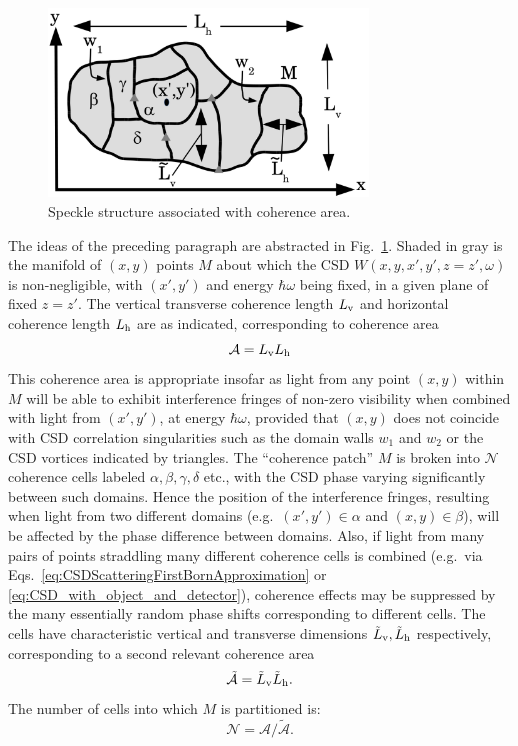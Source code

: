 \documentclass[%
 reprint,
 amsmath,amssymb,
 aps,
]{revtex4-1}
\begin{document}
\begin{figure}
\includegraphics[width=8.5cm]{Figures/CoherenceAreas.png}
\caption{Speckle structure associated with coherence area.}
\label{CoherenceAreas}
\end{figure}

The ideas of the preceding paragraph are abstracted in Fig.~\ref{CoherenceAreas}.  Shaded in gray is the manifold of $(x,y)$ points $M$ about which the CSD $W(x,y,x',y',z=z',\omega)$ is non-negligible, with $(x',y')$ and energy $\hbar\omega$ being fixed, in a given plane of fixed $z=z'$.  The vertical transverse coherence length $L_{\textrm v}$ and horizontal coherence length $L_{\textrm h}$ are as indicated, corresponding to coherence area
%
\begin{equation}
    \mathcal{A}=L_{\textrm v}L_{\textrm h}
\end{equation}
%
This coherence area is appropriate insofar as light from any point $(x,y)$ within $M$ will be able to exhibit interference fringes of non-zero visibility when combined with light from $(x',y')$, at energy $\hbar\omega$, provided that $(x,y)$ does not coincide with CSD correlation singularities such as the domain walls $w_1$ and $w_2$ or the CSD vortices indicated by triangles. The ``coherence patch'' $M$ is broken into $\mathcal{N}$ coherence cells labeled $\alpha,\beta,\gamma,\delta$ etc., with the CSD phase varying significantly between such domains.  Hence the position of the interference fringes, resulting when light from two different domains (e.g.~$(x',y')\in\alpha$ and $(x,y)\in\beta$), will be  affected by the phase difference between domains.  Also, if light from many pairs of points straddling many different coherence cells is combined (e.g.~via Eqs.~\ref{eq:CSDScatteringFirstBornApproximation} or  \ref{eq:CSD_with_object_and_detector}), coherence effects may be suppressed by the many essentially random phase shifts corresponding to different cells.  The cells have characteristic vertical and transverse dimensions $\tilde{L}_{\textrm v},\tilde{L}_{\textrm h}$ respectively, corresponding to a second relevant coherence area
%
\begin{equation}
    \tilde{\mathcal{A}}=\tilde{L}_{\textrm v} \tilde{L}_{\textrm h}.
\end{equation}
%
The number of cells into which $M$ is partitioned is:
\begin{equation}
    \mathcal{N}=\mathcal{A}/\mathcal{\tilde{A}}.
\end{equation}
\end{document}
